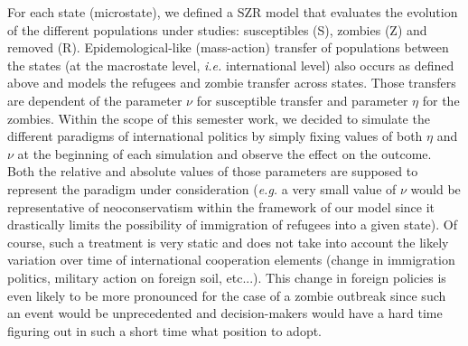 \documentclass[11pt]{article} %
\begin{document}
For each state (microstate), we defined a SZR model that evaluates the evolution of the different populations under studies: susceptibles (S), zombies (Z) and removed (R). Epidemological-like (mass-action) transfer of populations between the states (at the macrostate level, \textit{i.e.} international level) also occurs as defined above and models the refugees and zombie transfer across states. Those transfers are dependent of the parameter $\nu$ for susceptible transfer and parameter $\eta$ for the zombies. Within the scope of this semester work, we decided to simulate the different paradigms of international politics by simply fixing values of both $\eta$ and $\nu$ at the beginning of each simulation and observe the effect on the outcome. Both the relative and absolute values of those parameters are supposed to represent the paradigm under consideration (\textit{e.g.} a very small value of $\nu$ would be representative of neoconservatism within the framework of our model since it drastically limits the possibility of immigration of refugees into a given state). Of course, such a treatment is very static and does not take into account the likely variation over time of  international cooperation elements (change in immigration politics, military action on foreign soil, etc...). This change in foreign policies is even likely to be more pronounced for the case of a zombie outbreak since such an event would be unprecedented and decision-makers would have a hard time figuring out in such a short time what position to adopt. 
\end{document}
